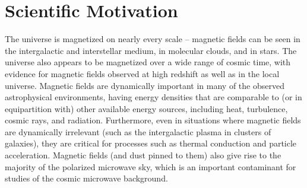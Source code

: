\vspace{-4mm}
\section{Scientific Motivation}
\label{sec:motivation}
\vspace{-3mm} 

The universe is magnetized on nearly every scale -- magnetic fields
can be seen in the intergalactic and interstellar medium, in
molecular clouds, and in stars.  The universe also appears to be
magnetized over a wide range of cosmic time, with evidence for
magnetic fields observed at high redshift as well as in the local
universe.  Magnetic fields are dynamically important in many of the
observed astrophysical environments, having energy densities that are
comparable to (or in equipartition with) other available energy
sources, including heat, turbulence, cosmic rays, and radiation.
Furthermore, even in situations where magnetic fields are dynamically
irrelevant (such as the intergalactic plasma in clusters of galaxies),
they are critical for processes such as thermal conduction and particle
acceleration.  Magnetic fields (and dust pinned to them) also give rise to the
majority of the polarized microwave sky, which is an important contaminant for
studies of the cosmic microwave background.  


 

